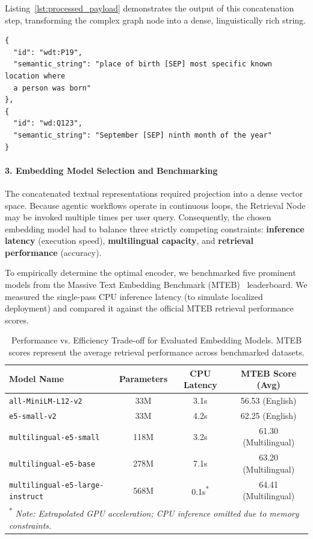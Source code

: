 Listing~\ref{lst:processed_payload} demonstrates the output of this concatenation step, transforming the complex graph node into a dense, linguistically rich string.

\begin{lstlisting}[basicstyle=\ttfamily\footnotesize, frame=single, caption={Extracted and Concatenated Keyword Payload for Embedding.}, label={lst:processed_payload}]
{
  "id": "wdt:P19",
  "semantic_string": "place of birth [SEP] most specific known location where 
  a person was born"
},
{
  "id": "wd:Q123",
  "semantic_string": "September [SEP] ninth month of the year"
}
\end{lstlisting}

\paragraph{3. Embedding Model Selection and Benchmarking}
The concatenated textual representations required projection into a dense vector space. Because agentic workflows operate in continuous loops, the Retrieval Node may be invoked multiple times per user query. Consequently, the chosen embedding model had to balance three strictly competing constraints: \textbf{inference latency} (execution speed), \textbf{multilingual capacity}, and \textbf{retrieval performance} (accuracy).

To empirically determine the optimal encoder, we benchmarked five prominent models from the Massive Text Embedding Benchmark (MTEB)~\cite{mteb2024leaderboard} leaderboard. We measured the single-pass CPU inference latency (to simulate localized deployment) and compared it against the official MTEB retrieval performance scores. 

\begin{table}[htbp]
\centering
\caption{Performance vs. Efficiency Trade-off for Evaluated Embedding Models. MTEB scores represent the average retrieval performance across benchmarked datasets.}
\label{tab:model_performance}
\begin{tabular}{lccc}
\hline
\textbf{Model Name} & \textbf{Parameters} & \textbf{CPU Latency} & \textbf{MTEB Score (Avg)} \\
\hline
\texttt{all-MiniLM-L12-v2} & 33M & 3.1s & 56.53 (English) \\
\texttt{e5-small-v2} & 33M & 4.2s & 62.25 (English) \\
\texttt{multilingual-e5-small} & 118M & 3.2s & 61.30 (Multilingual) \\
\texttt{multilingual-e5-base} & 278M & 7.1s & 63.20 (Multilingual) \\
\texttt{multilingual-e5-large-instruct} & 568M & 0.1s\textsuperscript{*} & 64.41 (Multilingual) \\
\hline
\multicolumn{4}{l}{\footnotesize \textsuperscript{*} \textit{Note: Extrapolated GPU acceleration; CPU inference omitted due to memory constraints.}} \\
\end{tabular}
\end{table}


